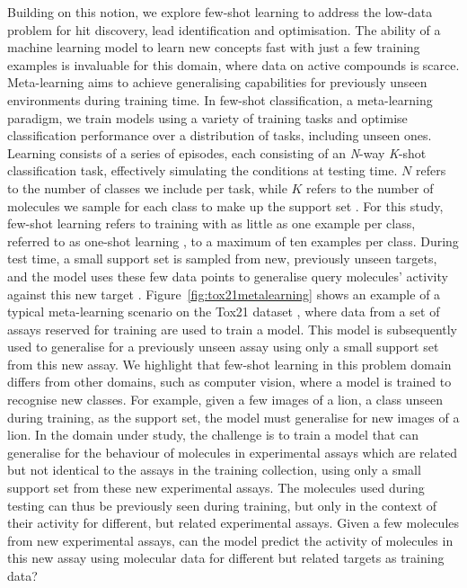 Building on this notion, we explore few-shot learning to address the low-data problem for hit discovery, lead identification and optimisation. The ability of a machine learning model to learn new concepts fast with just a few training examples is invaluable for this domain, where data on active compounds is scarce. Meta-learning aims to achieve generalising capabilities for previously unseen environments during training time. In few-shot classification, a meta-learning paradigm, we train models using a variety of training tasks and optimise classification performance over a distribution of tasks, including unseen ones. Learning consists of a series of episodes, each consisting of an \textit{N}-way \textit{K}-shot classification task, effectively simulating the conditions at testing time. $N$ refers to the number of classes we include per task, while $K$ refers to the number of molecules we sample for each class to make up the support set \cite{snell2017prototypical}. For this study, few-shot learning refers to training with as little as one example per class, referred to as one-shot learning \cite{koch2015siamese, vinyals2016matching}, to a maximum of ten examples per class. During test time, a small support set is sampled from new, previously unseen targets, and the model uses these few data points to generalise query molecules' activity against this new target \cite{vinyals2016matching}. Figure~\ref{fig:tox21metalearning} shows an example of a typical meta-learning scenario on the Tox21 dataset \citep{huang2016tox21challenge}, where data from a set of assays reserved for training are used to train a model. This model is subsequently used to generalise for a previously unseen assay using only a small support set from this new assay. We highlight that few-shot learning in this problem domain differs from other domains, such as computer vision, where a model is trained to recognise new classes. For example, given a few images of a lion, a class unseen during training, as the support set, the model must generalise for new images of a lion. In the domain under study, the challenge is to train a model that can generalise for the behaviour of molecules in experimental assays which are related but not identical to the assays in the training collection, using only a small support set from these new experimental assays. The molecules used during testing can thus be previously seen during training, but only in the context of their activity for different, but related experimental assays. Given a few molecules from new experimental assays, can the model predict the activity of molecules in this new assay using molecular data for different but related targets as training data?

